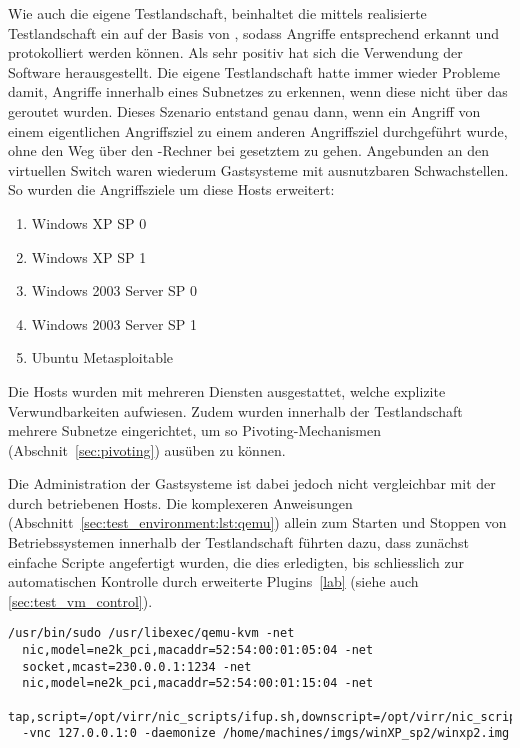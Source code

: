 Wie auch die eigene Testlandschaft, beinhaltet die mittels 
realisierte Testlandschaft ein  auf der Basis von
, sodass Angriffe entsprechend erkannt und protokolliert
werden können. Als sehr positiv hat sich die Verwendung der Software
 herausgestellt. Die eigene Testlandschaft hatte immer
wieder Probleme damit, Angriffe innerhalb eines Subnetzes zu erkennen,
wenn diese nicht über das  geroutet wurden. Dieses Szenario
entstand genau dann, wenn ein Angriff von einem eigentlichen
Angriffsziel zu einem anderen Angriffsziel durchgeführt wurde, ohne
den Weg über den -Rechner bei gesetztem  zu
gehen. Angebunden an den virtuellen Switch waren wiederum Gastsysteme
mit ausnutzbaren Schwachstellen. So wurden die Angriffsziele um diese
Hosts erweitert:

\begin{enumerate}
  \item Windows XP SP 0
  \item Windows XP SP 1
  \item Windows 2003 Server SP 0
  \item Windows 2003 Server SP 1
  \item Ubuntu Metasploitable
\end{enumerate}

Die Hosts wurden mit mehreren Diensten ausgestattet, welche explizite
Verwundbarkeiten aufwiesen. Zudem wurden innerhalb der Testlandschaft
mehrere Subnetze eingerichtet, um so Pivoting-Mechanismen
(Abschnit~\ref{sec:pivoting}) ausüben zu können.

Die Administration der Gastsysteme ist dabei jedoch nicht vergleichbar
mit der durch  betriebenen Hosts. Die komplexeren
Anweisungen (Abschnitt~\ref{sec:test_environment:lst:qemu}) allein
zum Starten und Stoppen von Betriebssystemen innerhalb der
Testlandschaft führten dazu, dass zunächst einfache Scripte
angefertigt wurden, die dies erledigten, bis schliesslich zur
automatischen Kontrolle durch erweiterte Plugins~\ref{lab} (siehe auch
\ref{sec:test_vm_control}).

\begin{lstlisting}[caption={Qemu Anweisung zum Starten eines Images},label=sec:test_environment:lst:qemu]
  /usr/bin/sudo /usr/libexec/qemu-kvm -net
  nic,model=ne2k_pci,macaddr=52:54:00:01:05:04 -net
  socket,mcast=230.0.0.1:1234 -net
  nic,model=ne2k_pci,macaddr=52:54:00:01:15:04 -net
  tap,script=/opt/virr/nic_scripts/ifup.sh,downscript=/opt/virr/nic_scripts/ifdown.sh
  -vnc 127.0.0.1:0 -daemonize /home/machines/imgs/winXP_sp2/winxp2.img
\end{lstlisting}

